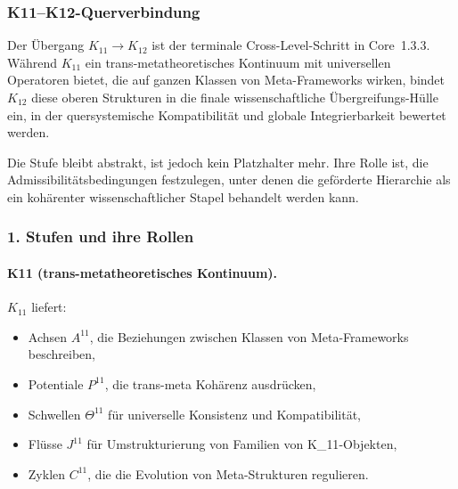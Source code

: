 
\subsubsection{K11–K12-Querverbindung}
\label{sec:crossk-k11-k12}

Der Übergang $K_{11} \rightarrow K_{12}$ ist der terminale Cross-Level-Schritt in
Core~1.3.3. Während $K_{11}$ ein trans-metatheoretisches Kontinuum mit
universellen Operatoren bietet, die auf ganzen Klassen von Meta-Frameworks wirken,
bindet $K_{12}$ diese oberen Strukturen in die finale wissenschaftliche
Übergreifungs-Hülle ein, in der quersystemische Kompatibilität und globale
Integrierbarkeit bewertet werden.

Die Stufe bleibt abstrakt, ist jedoch kein Platzhalter mehr. Ihre Rolle ist,
die Admissibilitätsbedingungen festzulegen, unter denen die geförderte Hierarchie
als ein kohärenter wissenschaftlicher Stapel behandelt werden kann.

\subsubsection{1. Stufen und ihre Rollen}

\paragraph{K11 (trans-metatheoretisches Kontinuum).}
$K_{11}$ liefert:
\begin{itemize}
  \item Achsen $A^{11}$, die Beziehungen zwischen Klassen von Meta-Frameworks
        beschreiben,
  \item Potentiale $P^{11}$, die trans-meta Kohärenz ausdrücken,
  \item Schwellen $\Theta^{11}$ für universelle Konsistenz und Kompatibilität,
  \item Flüsse $J^{11}$ für Umstrukturierung von Familien von K_{11}-Objekten,
  \item Zyklen $C^{11}$, die die Evolution von Meta-Strukturen regulieren.
\end{itemize}


